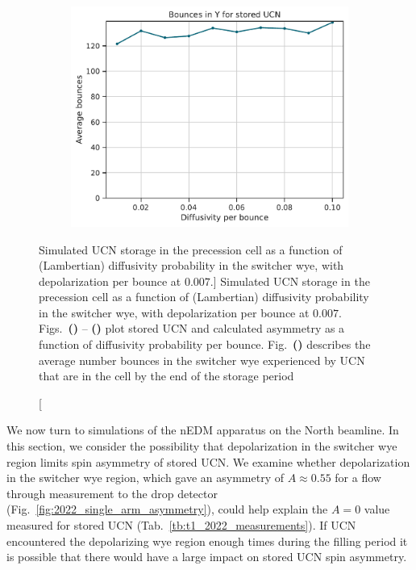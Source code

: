 \begin{figure}
\begin{subfigure}{.5\textwidth}
  \centering
  \includegraphics[width=\textwidth]{figures/average_bounces_in_y.pdf}
  \caption{}\label{subfig:average_bounces_in_y}
\end{subfigure}
\caption
[Simulated UCN storage in the precession cell as a function of (Lambertian) diffusivity probability in the switcher wye, with depolarization per bounce at $0.007$.]
{Simulated UCN storage in the precession cell as a function of (Lambertian) diffusivity probability in the switcher wye, with depolarization per bounce at $0.007$. Figs.~\textbf{()} -- \textbf{()} plot stored UCN and calculated asymmetry as a function of diffusivity probability per bounce. Fig.~\textbf{()} describes the average number bounces in the switcher wye experienced by UCN that are in the cell by the end of the storage period}
\label{fig:diffusivity_study}
\end{figure}

We now turn to \pentrack simulations of the nEDM apparatus on the North beamline. In this section, we consider the possibility that depolarization in the switcher wye region limits spin asymmetry of stored UCN. We examine whether depolarization in the switcher wye region, which gave an asymmetry of $A\approx0.55$ for a flow through measurement to the drop detector (Fig.~\ref{fig:2022_single_arm_asymmetry}), could help explain the $A=0$ value measured for stored UCN (Tab.~\ref{tb:t1_2022_measurements}). If UCN encountered the depolarizing wye region enough times during the filling period it is possible that there would have a large impact on stored UCN spin asymmetry.

